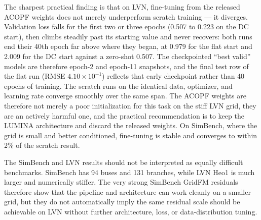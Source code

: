 \documentclass[10pt]{article}
\begin{document}
The sharpest practical finding is that on LVN, fine-tuning from the released ACOPF weights does not merely underperform scratch training --- it diverges. Validation loss falls for the first two or three epochs (0.507 to 0.223 on the DC start), then climbs steadily past its starting value and never recovers: both runs end their 40th epoch far above where they began, at 0.979 for the flat start and 2.009 for the DC start against a zero-shot 0.507. The checkpointed ``best valid'' models are therefore epoch-2 and epoch-11 snapshots, and the final test row of the flat run (RMSE \(4.10\times10^{-1}\)) reflects that early checkpoint rather than 40 epochs of training. The scratch runs on the identical data, optimizer, and learning rate converge smoothly over the same span. The ACOPF weights are therefore not merely a poor initialization for this task on the stiff LVN grid, they are an actively harmful one, and the practical recommendation is to keep the LUMINA architecture and discard the released weights. On SimBench, where the grid is small and better conditioned, fine-tuning is stable and converges to within 2\% of the scratch result.

The SimBench and LVN results should not be interpreted as equally difficult benchmarks. SimBench has 94 buses and 131 branches, while LVN Heo1 is much larger and numerically stiffer. The very strong SimBench GridFM residuals therefore show that the pipeline and architecture can work cleanly on a smaller grid, but they do not automatically imply the same residual scale should be achievable on LVN without further architecture, loss, or data-distribution tuning.
\end{document}
